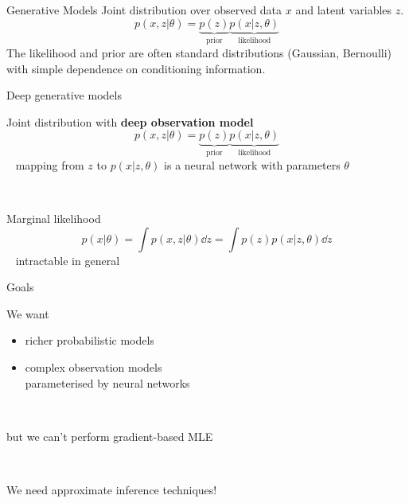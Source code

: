 \begin{frame}{Generative Models}
Joint distribution over observed data $ x $ and latent variables $ z $.
\begin{equation*}
p(x,z|\theta) =  \underbrace{p(z)}_{\text{prior}} \underbrace{p(x|z,\theta)}_{\text{likelihood}}
\end{equation*} 
The likelihood and prior are often standard distributions (Gaussian, Bernoulli) with simple dependence on conditioning
information.
\end{frame}

\begin{frame}{Deep generative models}

Joint distribution with {\bf deep observation model}
\begin{equation*}
p(x, z|\theta) = \underbrace{p(z)}_{\text{prior}} \underbrace{p(x|z, \theta)}_{\text{likelihood}}
\end{equation*}
~ {\small mapping from $z$ to $p(x|z, \theta)$ is a neural network with parameters $\theta$}

~ \pause

Marginal likelihood 
\begin{equation*}
p(x|\theta) = \int p(x, z|\theta) \dd{z} = \int p(z)p(x|z, \theta) \dd{z} 
\end{equation*}
~ \alert{intractable} in general



\end{frame}


\begin{frame}{Goals}


We want
\begin{itemize}
	\item richer probabilistic models  \pause
	\item complex observation models \\
	parameterised by neural networks 
\end{itemize}
\pause

~

but we can't perform gradient-based MLE

~

\pause

We need \alert{approximate inference} techniques!

\end{frame}


